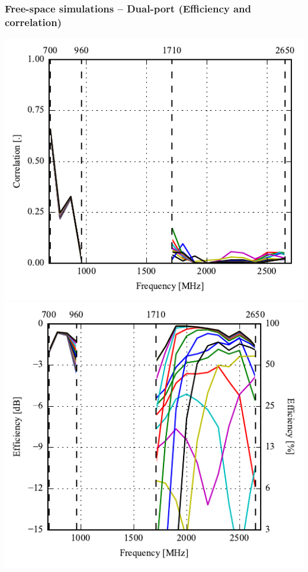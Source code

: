 \begin{frame}
    \frametitle{Free-space simulations -- Dual-port (Efficiency and correlation)}
    \vspace*{-0.5cm}
  \begin{minipage}[t]{0.49\linewidth}
    \vspace{0mm}

    \includegraphics[width=0.78\linewidth]{img/henrik/dp/sweep_top_corr} \\
    \includegraphics[width=0.78\linewidth]{img/henrik/dp/efficiency-ac2-top.pdf} 

  \end{minipage}\hfill       
  \begin{minipage}[t]{0.49\linewidth}
    \vspace{0 mm}


\end{minipage}
\end{frame}
